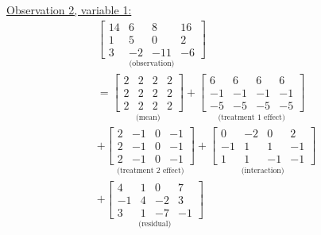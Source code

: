 \begin{enumerate}[label= (\alph*)]
    \underline{Observation 2, variable 1:}
    \begin{multline*}
        \underset{\text{(observation)}}{
            \left[
                \begin{array}{rrrr}
                    14 &  6 &   8 & 16 \\
                     1 &  5 &   0 &  2 \\
                     3 & -2 & -11 & -6
                \end{array}
            \right]
        }
        \\
        =
        \underset{\text{(mean)}}{
            \left[
                \begin{array}{rrrr}
                    2 & 2 & 2 & 2 \\
                    2 & 2 & 2 & 2 \\
                    2 & 2 & 2 & 2
                \end{array}
            \right]
        }
        +
        \underset{\text{(treatment 1 effect)}}{
            \left[
                \begin{array}{rrrr}
                     6 &  6 &  6 &  6 \\
                    -1 & -1 & -1 & -1 \\
                    -5 & -5 & -5 & -5 
                \end{array}
            \right]
        }
        \\
        +
        \underset{\text{(treatment 2 effect)}}{
            \left[
                \begin{array}{rrrr}
                    2 & -1 & 0 & -1 \\
                    2 & -1 & 0 & -1 \\
                    2 & -1 & 0 & -1
                \end{array}
            \right]
        }
        +
        \underset{\text{(interaction)}}{
            \left[
                \begin{array}{rrrr}
                     0 & -2 &  0 &  2 \\
                    -1 &  1 &  1 & -1 \\
                     1 &  1 & -1 & -1
                \end{array}
            \right]
        }
        \\
        +
        \underset{\text{(residual)}}{
            \left[
                \begin{array}{rrrr}
                     4 &  1 &  0 &  7 \\
                    -1 &  4 & -2 &  3 \\
                     3 &  1 & -7 & -1
                \end{array}
            \right]
        }
    \end{multline*}
    

\end{enumerate}
